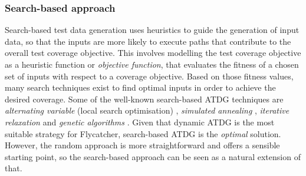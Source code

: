 
\subsubsection{Search-based approach}

Search-based test data generation uses heuristics to guide the generation of input data, so that the inputs are more likely to execute paths that contribute to the overall test coverage objective. This involves modelling the test coverage objective as a heuristic function or \emph{objective function}, that evaluates the fitness of a chosen set of inputs with respect to a coverage objective. Based on those fitness values, many search techniques exist to find optimal inputs in order to achieve the desired coverage. Some of the well-known search-based ATDG techniques are \emph{alternating variable} (local search optimisation) \cite{korel1990automated, gallagher1997adtest}, \emph{simulated annealing} \cite{tracey1998automated,tracey1998way}, \emph{iterative relaxation} \cite{gupta1998automated} and \emph{genetic algorithms} \cite{michael1998automated,michael2001generating}. Given that dynamic ATDG is the most suitable strategy for \textsf{Flycatcher}, search-based ATDG is the \emph{optimal} solution. However, the random approach is more straightforward and offers a sensible starting point, so the search-based approach can be seen as a natural extension of that.
 
